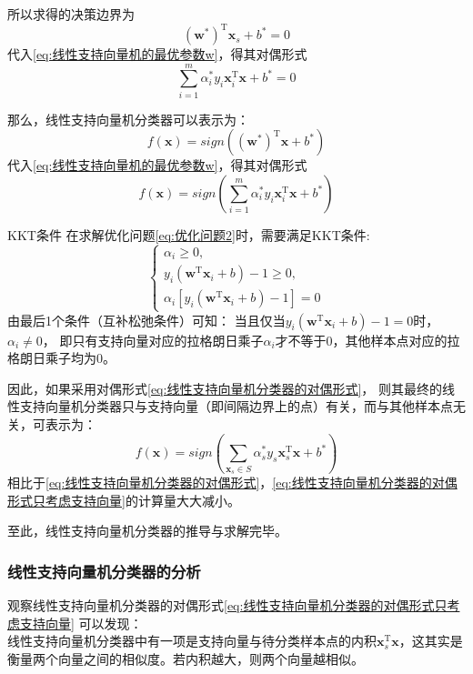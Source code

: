 \documentclass[withoutpreface,bwprint]{NoteBook}
\begin{document}
所以求得的决策边界为
$$
(\mathbf{w}^*)^\mathrm{T} \mathbf{x}_s + b^* = 0
$$
代入\cref{eq:线性支持向量机的最优参数w}，得其对偶形式
$$
\sum_{i=1}^{m} \alpha_i^* y_i \mathbf{x}_i^\mathrm{T} \mathbf{x} + b^* = 0
$$

那么，线性支持向量机分类器可以表示为：
\begin{equation}
    \label{eq:线性支持向量机分类器}
    f(\mathbf{x}) = sign \left( (\mathbf{w}^*)^\mathrm{T} \mathbf{x} + b^* \right)
\end{equation}
代入\cref{eq:线性支持向量机的最优参数w}，得其对偶形式
\begin{equation}
    \label{eq:线性支持向量机分类器的对偶形式}
    f(\mathbf{x}) = sign \left( \sum_{i=1}^{m} \alpha_i^* y_i \mathbf{x}_i^\mathrm{T} \mathbf{x} + b^* \right)
\end{equation}

\begin{criticalSteps}
    {KKT条件}
    {}
在求解优化问题\cref{eq:优化问题2}时，需要满足KKT条件:
\begin{equation}
    \label{eq:线性支持向量机的KKT条件}
    \begin{cases}
        \alpha_i \geq 0,\\
        y_i(\mathbf{w}^\mathrm{T} \mathbf{x}_i + b) - 1 \geq 0, \\
        \alpha_i \left[ y_i(\mathbf{w}^\mathrm{T} \mathbf{x}_i + b) - 1 \right] = 0
    \end{cases}
\end{equation}
由最后1个条件（互补松弛条件）可知：
当且仅当$y_i(\mathbf{w}^\mathrm{T} \mathbf{x}_i + b) - 1 = 0$时，$\alpha_i \neq 0$，
即只有支持向量对应的拉格朗日乘子$\alpha_i$才不等于0，其他样本点对应的拉格朗日乘子均为0。
\end{criticalSteps}

因此，如果采用对偶形式\cref{eq:线性支持向量机分类器的对偶形式}，
则其最终的线性支持向量机分类器只与支持向量（即间隔边界上的点）有关，而与其他样本点无关，可表示为：
\begin{equation}
    \label{eq:线性支持向量机分类器的对偶形式只考虑支持向量}
    f(\mathbf{x}) = sign \left( \sum_{\mathbf{x}_s \in S} \alpha_s^* y_s \mathbf{x}_s^\mathrm{T} \mathbf{x} + b^* \right)
\end{equation}
相比于\cref{eq:线性支持向量机分类器的对偶形式}，\cref{eq:线性支持向量机分类器的对偶形式只考虑支持向量}的计算量大大减小。

至此，线性支持向量机分类器的推导与求解完毕。

\subsubsection{线性支持向量机分类器的分析}
观察线性支持向量机分类器的对偶形式\cref{eq:线性支持向量机分类器的对偶形式只考虑支持向量}
可以发现：\\
    线性支持向量机分类器中有一项是支持向量与待分类样本点的内积$\mathbf{x}_s^\mathrm{T} \mathbf{x}$，这其实是衡量两个向量之间的相似度。若内积越大，则两个向量越相似。
\end{document}
